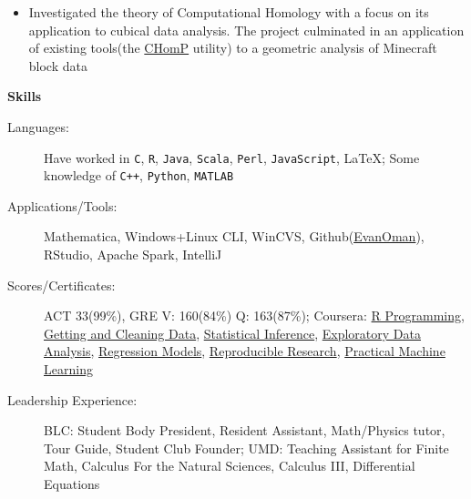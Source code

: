 \documentclass[letterpaper,10pt]{article}
\newcommand{\resitem}[1]{\item[$\triangleright$] #1 

\vspace{-.1in}
}
\newcommand{\resheading}[1]{
	{
		\large\colorbox{mygrey}
		{
			\begin{minipage}{.98\textwidth}

			\centerline{\textbf{#1 \vphantom{p\^{E}}}}
			\end{minipage}
		}
	}
}
\begin{document}
			\vspace{-.1in}
			\begin{itemize}
				\vspace{-.15in}
				\resitem{Investigated the theory of Computational Homology with a focus on its application to cubical data analysis. The project culminated in an application of existing tools(the \href{http://chomp.rutgers.edu/}{CHomP} utility) to a geometric analysis of Minecraft block data}
			\end{itemize}
			\vspace{.1in}
	\resheading{Skills}
		\vspace{-.1in}
		\begin{description}
			\item[Languages:]
			Have worked in \verb!C!, \verb!R!, \verb!Java!, \verb!Scala!, \verb!Perl!, \verb!JavaScript!, \LaTeX; Some knowledge of \verb!C++!, \verb!Python!, \verb!MATLAB!
			\item[Applications/Tools:]
			Mathematica, Windows+Linux CLI, WinCVS, Github(\href{https://www.github.com/EvanOman}{EvanOman}), RStudio, Apache Spark, IntelliJ

			\item[Scores/Certificates:]
			ACT 33(99\%), GRE V: 160(84\%) Q: 163(87\%); Coursera: \href{https://www.coursera.org/account/accomplishments/records/cxq3vN5HB76be56t}{R Programming}, \href{https://www.coursera.org/account/accomplishments/records/Xt3sCA24Qz3Par7M}{Getting and Cleaning Data}, \href{https://www.coursera.org/account/accomplishments/records/yPex7nURcXCYdsse}{Statistical Inference}, \href{https://www.coursera.org/account/accomplishments/records/XMkgJcmHPGtNBXsU}{Exploratory Data Analysis}, \href{https://www.coursera.org/account/accomplishments/records/Qx8qaDCvw9ZNQtqP}{Regression Models}, \href{https://www.coursera.org/account/accomplishments/records/g5LfcvAD5rJuEnGX}{Reproducible Research},
			\href{https://www.coursera.org/account/accomplishments/verify/ZNTJVMJKSH}{Practical Machine Learning}

			\item[Leadership Experience:]
			BLC: Student Body President, Resident Assistant, Math/Physics tutor, Tour Guide, Student Club Founder; UMD: Teaching Assistant for Finite Math, Calculus For the Natural Sciences, Calculus III, Differential Equations
		\end{description}
\end{document}
